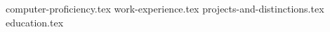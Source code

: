 \documentclass[11pt, a4paper]{awesome-cv}
\newcommand*{\sectiondir}{resume/}
\begin{document}
\makecvheader

{computer-proficiency.tex}
{work-experience.tex}
{projects-and-distinctions.tex}
{education.tex}
\end{document}
